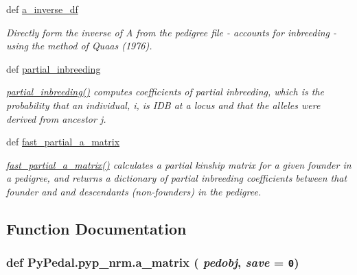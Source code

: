 \begin{CompactItemize}
def \hyperlink{namespacePyPedal_1_1pyp__nrm_4bb868be035fbfd5953a580b441cd566}{a\_\-inverse\_\-df}
\begin{CompactList}\small\item\em Directly form the inverse of A from the pedigree file - accounts for inbreeding - using the method of Quaas (1976). \item\end{CompactList}\item 
def \hyperlink{namespacePyPedal_1_1pyp__nrm_271ba7166235340580cfe58aa31c887d}{partial\_\-inbreeding}
\begin{CompactList}\small\item\em \hyperlink{namespacePyPedal_1_1pyp__nrm_271ba7166235340580cfe58aa31c887d}{partial\_\-inbreeding()} computes coefficients of partial inbreeding, which is the probability that an individual, i, is IDB at a locus and that the alleles were derived from ancestor j. \item\end{CompactList}\item 
def \hyperlink{namespacePyPedal_1_1pyp__nrm_aeaadca15ddc3430d7b46cde3470e808}{fast\_\-partial\_\-a\_\-matrix}
\begin{CompactList}\small\item\em \hyperlink{namespacePyPedal_1_1pyp__nrm_aeaadca15ddc3430d7b46cde3470e808}{fast\_\-partial\_\-a\_\-matrix()} calculates a partial kinship matrix for a given founder in a pedigree, and returns a dictionary of partial inbreeding coefficients between that founder and and descendants (non-founders) in the pedigree. \item\end{CompactList}\end{CompactItemize}


\subsection{Function Documentation}
\hypertarget{namespacePyPedal_1_1pyp__nrm_160c730a5f8ed4809c427645d3331262}{
\subsubsection[a\_\-matrix]{\setlength{\rightskip}{0pt plus 5cm}def Py\-Pedal.pyp\_\-nrm.a\_\-matrix ( {\em pedobj},  {\em save} = {\tt 0})}}
\label{namespacePyPedal_1_1pyp__nrm_160c730a5f8ed4809c427645d3331262}


